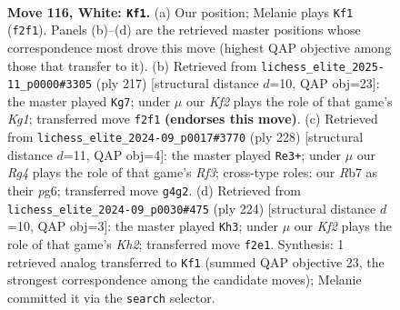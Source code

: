 \documentclass[11pt]{article}
\begin{document}
\clearpage

\begin{figure}[p]\centering
\begin{subfigure}{0.46\textwidth}\centering
\resizebox{\linewidth}{!}{%
\newchessgame
\chessboard[
  setfen={3k4/1R6/4p3/4P3/5PR1/8/5K1r/8 w - - 17 116},
  showmover=false,
  pgfstyle=straightmove, color=movearrow, markmove={f2-f1}
]}
\caption{}
\end{subfigure}\hfill
\begin{subfigure}{0.46\textwidth}\centering
\resizebox{\linewidth}{!}{%
\newchessgame
\chessboard[
  setfen={R5k1/8/1r5p/4K2P/8/8/8/8 b - - 14 109},
  showmover=false,
  pgfstyle=straightmove, color=movearrow, markmove={g8-g7}
]}
\caption{}
\end{subfigure}
\\[4pt]
\begin{subfigure}{0.46\textwidth}\centering
\resizebox{\linewidth}{!}{%
\newchessgame
\chessboard[
  setfen={8/r7/4k1p1/7p/7P/5RP1/8/6K1 w - - 66 115},
  showmover=false,
  pgfstyle=straightmove, color=movearrow, markmove={f3-e3}
]}
\caption{}
\end{subfigure}\hfill
\begin{subfigure}{0.46\textwidth}\centering
\resizebox{\linewidth}{!}{%
\newchessgame
\chessboard[
  setfen={8/6k1/2R5/7p/7P/6P1/7K/r7 w - - 71 113},
  showmover=false,
  pgfstyle=straightmove, color=movearrow, markmove={h2-h3}
]}
\caption{}
\end{subfigure}
\caption{\textbf{Move 116, White: \texttt{Kf1}.} (a) Our position; Melanie plays \texttt{Kf1} (\texttt{f2f1}). Panels (b)--(d) are the retrieved master positions whose correspondence most drove this move (highest QAP objective among those that transfer to it). (b) Retrieved from \texttt{lichess\_elite\_2025-11\_p0000\#3305} (ply 217) [structural distance $d$=10, QAP obj=23]: the master played \texttt{Kg7}; under $\mu$ our \emph{Kf2} plays the role of that game's \emph{Kg1}; transferred move \texttt{f2f1} \textbf{(endorses this move)}. (c) Retrieved from \texttt{lichess\_elite\_2024-09\_p0017\#3770} (ply 228) [structural distance $d$=11, QAP obj=4]: the master played \texttt{Re3+}; under $\mu$ our \emph{Rg4} plays the role of that game's \emph{Rf3}; cross-type roles: our \emph{R}b7 as their \emph{p}g6; transferred move \texttt{g4g2}. (d) Retrieved from \texttt{lichess\_elite\_2024-09\_p0030\#475} (ply 224) [structural distance $d$=10, QAP obj=3]: the master played \texttt{Kh3}; under $\mu$ our \emph{Kf2} plays the role of that game's \emph{Kh2}; transferred move \texttt{f2e1}. Synthesis: 1 retrieved analog transferred to \texttt{Kf1} (summed QAP objective 23, the strongest correspondence among the candidate moves); Melanie committed it via the \texttt{search} selector.}
\label{fig:thought-m230}
\end{figure}
\end{document}
